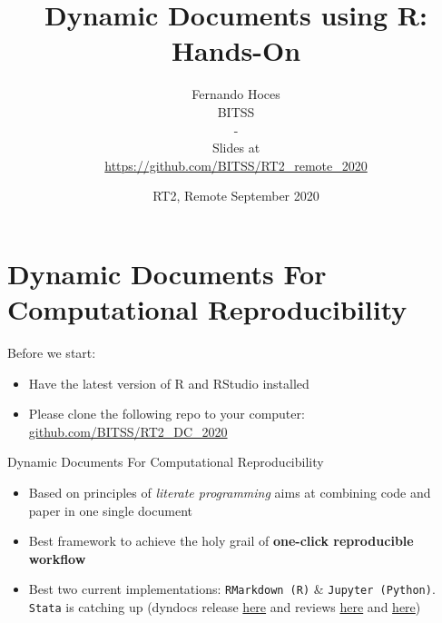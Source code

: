 \documentclass[ignorenonframetext,]{beamer}
\title{Dynamic Documents using R: Hands-On}
\author{Fernando Hoces\\
BITSS\\
-\\
Slides at\\
\hspace*{0.333em}\url{https://github.com/BITSS/RT2_remote_2020}}
\date{RT2, Remote September 2020}
\providecommand{\tightlist}{%
  \setlength{\itemsep}{0pt}\setlength{\parskip}{0pt}}
\begin{document}
\frame{\titlepage}

\begin{frame}
\tableofcontents[hideallsubsections]
\end{frame}
\hypertarget{dynamic-documents-for-computational-reproducibility}{%
\section{Dynamic Documents For Computational
Reproducibility}\label{dynamic-documents-for-computational-reproducibility}}

\begin{frame}{Before we start:}
\protect\hypertarget{before-we-start}{}

\begin{itemize}
\tightlist
\item
  Have the latest version of R and RStudio installed\\
\item
  Please clone the following repo to your computer:
  \href{https://github.com/BITSS/RT2_DC_2020}{github.com/BITSS/RT2\_DC\_2020}
\end{itemize}

\end{frame}

\begin{frame}[fragile]{Dynamic Documents For Computational
Reproducibility}
\protect\hypertarget{dynamic-documents-for-computational-reproducibility-1}{}

\begin{itemize}
\tightlist
\item
  Based on principles of \emph{literate programming} aims at combining
  code and paper in one single document
\item
  Best framework to achieve the holy grail of \textbf{one-click
  reproducible workflow}
\item
  Best two current implementations: \texttt{RMarkdown\ (R)} \&
  \texttt{Jupyter\ (Python)}. \texttt{Stata} is catching up (dyndocs
  release \href{https://www.stata.com/new-in-stata/markdown/}{here} and
  reviews
  \href{http://data.princeton.edu/stata/markdown/markstat.htm}{here} and
  \href{https://www.bitss.org/2017/09/05/review-of-statas-dyndoc/}{here})
\end{itemize}

\end{frame}
\end{document}
